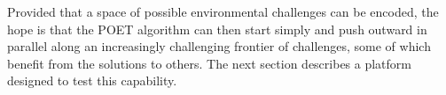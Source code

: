 \documentclass{article}
\newcommand{\jc}[1]{\comments{\textcolor{deepForestGreen}{[JC: #1]}}}
\newcommand{\jl}[1]{\comments{\textcolor{magenta}{[Joel: #1]}}}
\newcommand{\ks}[1]{\comments{\textcolor{purple}{[Ken: #1]}}}
\newcommand{\rw}[1]{\comments{\textcolor{blue}{[Rui: #1]}}}
\newcommand{\comments}[1]{#1}
\begin{document}
Provided that a space of possible environmental challenges can be encoded, the hope is that the POET algorithm can then start simply and push outward in parallel along an increasingly challenging frontier of challenges, some of which benefit from the solutions to others.  The next section describes a platform designed to test this capability.


\end{document}
